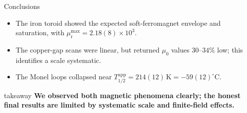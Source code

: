 \documentclass[aspectratio=169]{beamer}
\newcommand{\mur}{\mu_{\mathrm r}}
\newcommand{\Tapp}{T_{1/2}^{\mathrm{app}}}
\newcommand{\takeaway}[1]{%
  \vspace{0.1em}
  \begin{center}
    \begin{beamercolorbox}[wd=0.94\textwidth,sep=0.35em,center,rounded=true]{takeaway}
      \textbf{#1}
    \end{beamercolorbox}
  \end{center}
}
\begin{document}
\begin{frame}{Conclusions}
  \large
  \begin{itemize}
    \item The iron toroid showed the expected soft-ferromagnet envelope and saturation, with $\mur^{\max}=2.18(8)\times10^3$.
    \item The copper-gap scans were linear, but returned $\mu_0$ values $30$--$34\%$ low; this identifies a scale systematic.
    \item The Monel loops collapsed near $\Tapp=214(12)\,\mathrm K=-59(12)^\circ\mathrm C$.
  \end{itemize}
  \takeaway{We observed both magnetic phenomena clearly; the honest final results are limited by systematic scale and finite-field effects.}
\end{frame}
\end{document}
